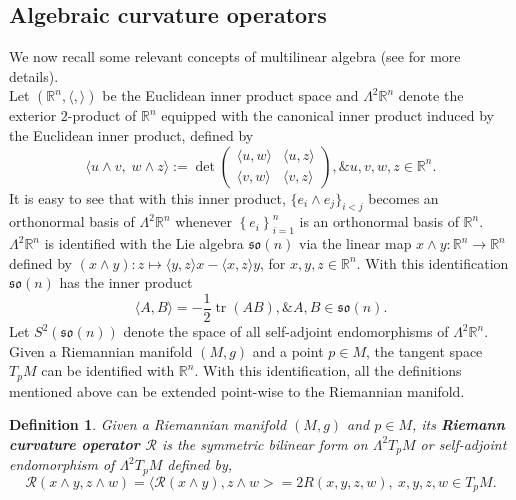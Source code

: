 \documentclass[12pt]{amsart}
\newtheorem{definition}[theorem]{Definition}
\theoremstyle{definition}
\numberwithin{equation}{section}
\begin{document}
\subsection{Algebraic curvature operators}
\noindent We now recall some relevant concepts of multilinear algebra (see \cite{BCRF} for more details).\\
\noindent Let $(\mathbb{R}^{n},\langle , \rangle)$ be the Euclidean inner product space and $\Lambda ^{2}\mathbb{R}^{n}$ denote the exterior $2$-product of  $\mathbb{R}^n$ equipped with the canonical inner product induced by the Euclidean inner product, defined by
\[
\langle u \wedge v,\; w \wedge z \rangle := \det \begin{pmatrix}
\langle u, w \rangle & \langle u, z \rangle \\
\langle v, w \rangle & \langle v, z \rangle
\end{pmatrix}, \& u,v,w,z \in \mathbb{R}^{n}.
\]
It is easy to see that with this inner product, $\{e_{i} \wedge e_{j}\}_{i<j}$ becomes an orthonormal basis of $\Lambda^2 \mathbb{R}^n$ whenever $\left\{e_i\right\}_{i=1}^n$ is an orthonormal basis of $\mathbb{R}^n$. $\Lambda^2 \mathbb{R}^n$ is identified with the Lie algebra $\mathfrak{so}(n)$ via the linear map $x \wedge y: \mathbb{R}^n \rightarrow \mathbb{R}^n$ defined by $(x \wedge y): z \mapsto\langle y, z\rangle x-\langle x, z\rangle y$, for $x, y, z \in \mathbb{R}^n$. With this identification $\mathfrak{so}(n)$ has the inner product $$\langle A, B\rangle=-\frac{1}{2} \operatorname{tr}(A B), \& A,B \in \mathfrak{so}(n).$$
Let $S^{2}(\mathfrak{so}(n))$ denote the space of all self-adjoint endomorphisms of $\Lambda^{2}\mathbb{R}^{n}$.\\
\noindent Given a Riemannian manifold $(M,g)$ and a point $p \in M$, the tangent space $T_{p}M$ can be identified with $\mathbb{R}^{n}$. With this identification, all the definitions mentioned above can be extended point-wise to the Riemannian manifold.
\begin{definition}
Given a Riemannian manifold $(M,g)$ and $p \in M$, its \textbf{Riemann curvature operator $\mathcal{R}$} is the symmetric bilinear form on $\Lambda ^{2} T_{p}M$ or self-adjoint endomorphism of $\Lambda ^{2} T_{p}M$ defined by,
$$\mathcal{R}(x \wedge y, z \wedge w) = \langle \mathcal{R}(x \wedge y), z \wedge w> = 2R(x,y,z,w), \  x,y,z,w \in T_pM.$$
\end{definition}
\end{document}
